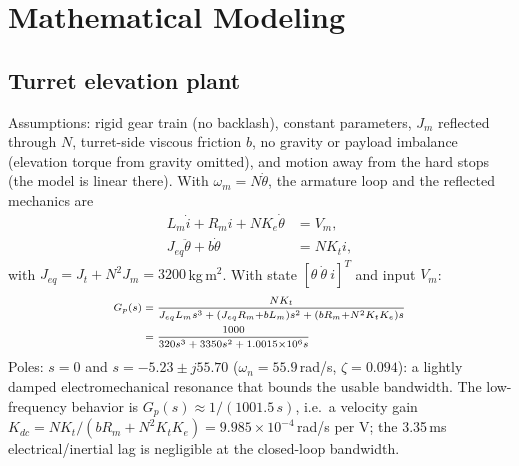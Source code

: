 \documentclass[10pt, conference]{IEEEtran}
\begin{document}
\section{Mathematical Modeling}
\subsection{Turret elevation plant}
Assumptions: rigid gear train (no backlash), constant parameters, $J_m$ reflected through $N$, turret-side viscous friction $b$, no gravity or payload imbalance (elevation torque from gravity omitted), and motion away from the hard stops (the model is linear there). With $\omega_m=N\dot\theta$, the armature loop and the reflected mechanics are
\begin{align}
L_m \dot i + R_m i + N K_e\dot\theta &= V_m,\\
J_{eq}\ddot\theta + b\dot\theta &= N K_t i,
\end{align}
with $J_{eq}=J_t+N^2J_m=3200$\,kg\,m$^2$.
With state $[\theta\ \dot\theta\ i]^T$ and input $V_m$:
\begin{equation}\scriptsize
\begin{split}G_p(s)&=\frac{N K_t}{J_{eq}L_m s^3+(J_{eq}R_m{+}bL_m)s^2+(bR_m{+}N^2K_tK_e)s}\\
&=\frac{1000}{320s^3+3350s^2+1.0015{\times}10^6 s}\end{split}
\end{equation}
Poles: $s=0$ and $s=-5.23\pm j55.70$ ($\omega_n=55.9$\,rad/s, $\zeta=0.094$): a lightly damped electromechanical resonance that bounds the usable bandwidth. The low-frequency behavior is $G_p(s)\approx 1/(1001.5\,s)$, i.e.\ a velocity gain $K_{dc}=N K_t/(bR_m+N^2K_tK_e)=9.985{\times}10^{-4}$\,rad/s per V; the 3.35\,ms electrical/inertial lag is negligible at the closed-loop bandwidth.
\end{document}

